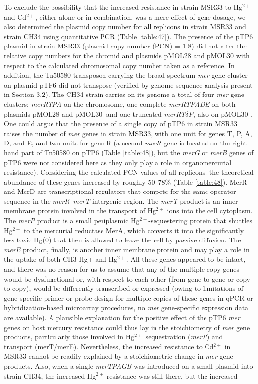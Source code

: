To exclude the possibility that the increased resistance in strain MSR33 to Hg$^{2+}$ and Cd$^{2+}$, either alone or in combination, was a mere effect of gene dosage, we also determined the plasmid copy number for all replicons in strain MSR33 and strain CH34 using quantitative PCR (Table \ref{table:47}). The presence of the pTP6 plasmid in strain MSR33 (plasmid copy number (PCN) = 1.8) did not alter the relative copy numbers for the chromid and plasmids pMOL28 and pMOL30 with respect to the calculated chromosomal copy number taken as a reference. In addition, the Tn50580 transposon carrying the broad spectrum \textit{mer} gene cluster on plasmid pTP6 did not transpose (verified by genome sequence analysis present in Section 3.2).
The CH34 strain carries on its genome a total of four \textit{mer} gene clusters: \textit{merRTPA} on the chromosome, one complete \textit{merRTPADE} on both plasmids pMOL28 and pMOL30, and one truncated \textit{merRT$\delta$P}, also on pMOL30 \citep{janssen2010complete}. One could argue that the presence of a single copy of pTP6 in strain MSR33 raises the number of \textit{mer} genes in strain MSR33, with one unit for genes T, P, A, D, and E, and two units for gene R (a second \textit{merR} gene is located on the right-hand part of Tn50580 on pTP6 \citep{smalla2006increased} (Table \ref{table:48}), but the \textit{merG} or \textit{merB} genes of pTP6 were not considered here as they only play a role in organomercurial resistance). Considering the calculated PCN values of all replicons, the theoretical abundance of these genes increased by roughly 50–78\% (Table \ref{table:48}). MerR and MerD are transcriptional regulators that compete for the same operator sequence in the \textit{merR}–\textit{merT} intergenic region. The \textit{merT} product is an inner membrane protein involved in the transport of Hg$^{2+}$ ions into the cell cytoplasm. The \textit{merP} product is a small periplasmic Hg$^{2+}$-sequestering protein that shuttles Hg$^{2+}$ to the mercurial reductase MerA, which converts it into the significantly less toxic Hg(0) that then is allowed to leave the cell by passive diffusion. The \textit{merE} product, finally, is another inner membrane protein and may play a role in the uptake of both CH3-Hg+ and Hg$^{2+}$. All these genes appeared to be intact, and there was no reason for us to assume that any of the multiple-copy genes would be dysfunctional or, with respect to each other (from gene to gene or copy to copy), would be differently transcribed or expressed (owing to limitations of gene-specific primer or probe design for multiple copies of these genes in qPCR or hybridization-based microarray procedures, no \textit{mer} gene-specific expression data are available). A plausible explanation for the positive effect of the pTP6 \textit{mer} genes on host mercury resistance could thus lay in the stoichiometry of \textit{mer} gene products, particularly those involved in Hg$^{2+}$ sequestration (\textit{merP}) and transport (merT/merE). Nevertheless, the increased resistance to Cd$^{2+}$ in MSR33 cannot be readily explained by a stoichiometric change in \textit{mer} gene products. Also, when a single \textit{merTPAGB} was introduced on a small plasmid into strain CH34, the increased Hg$^{2+}$ resistance was still there, but the increased 